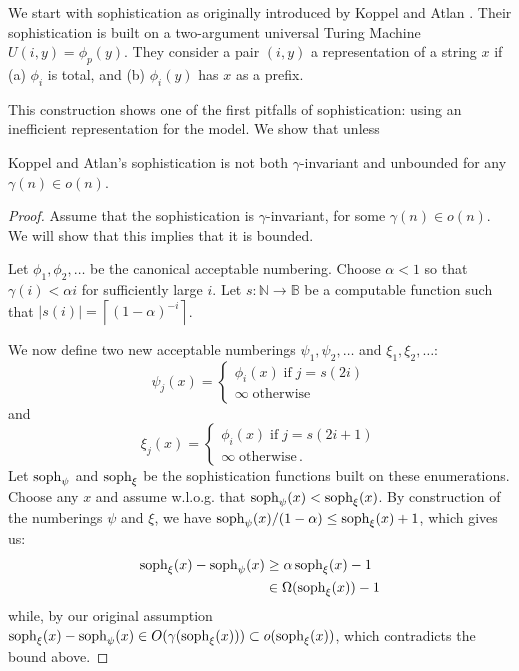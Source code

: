 \documentclass{style/llncs}
\newcommand{\B}{\mathbb B}
\newcommand{\N}{\mathbb N}
\newcommand{\tn}[1]{\textnormal{#1}}
\newcommand{\s}{\tn{soph}}
\newcommand{\num}[1]{#1_1, #1_2, \ldots}
\newcommand{\p}{\,\text{.}}
\begin{document}
We start with sophistication as originally introduced by Koppel and Atlan \cite{koppelSoph1988,koppel1991almost}. Their sophistication is built on a two-argument universal Turing Machine $U(i, y) = \phi_p(y)$. They consider a pair $(i, y)$ a representation of a string $x$ if (a) $\phi_i$ is total, and (b) $\phi_i(y)$ has $x$ as a prefix.\footnotemark 


This construction shows one of the first pitfalls of sophistication: using an inefficient representation for the model. We show that unless 
\begin{lemma}
Koppel and Atlan's sophistication is not both $\gamma$-invariant and unbounded for any $\gamma(n) \in o(n)$.
\end{lemma}
\begin{proof}
Assume that the sophistication is $\gamma$-invariant, for some $\gamma(n) \in o(n)$. We will show that this implies that it is bounded.

Let $\num{\phi}$ be the canonical acceptable numbering. Choose $\alpha < 1$ so that $\gamma(i) < \alpha i$ for sufficiently large $i$. Let $s: \N \to \B$ be a computable function such that $|s(i)| = \left\lceil(1-\alpha)^{-i}\right\rceil$.

We now define two new acceptable numberings $\num{\psi}$ and $\num{\xi}$:
\[
\psi_j(x) = 
\begin{cases}
	\phi_i(x) \;\text{if}\; j = s(2i) \\
	\infty\;\text{otherwise}
\end{cases}
\]
and 
\[
\xi_j(x) = 
\begin{cases}
	\phi_i(x) \;\text{if}\; j = s(2i+1) \\
	\infty \;\text{otherwise}\p
\end{cases}
\]
Let $\s_\psi$ and $\s_\xi$ be the sophistication functions built on these enumerations. Choose any $x$ and assume w.l.o.g. that $\s_\psi(x) < \s_\xi(x)$. By construction of the numberings $\psi$ and $\xi$, we have $\s_\psi(x)/ (1-\alpha)  \leq \s_\xi(x) + 1$, which gives us:
\begin{align*}
	\s_\xi(x) - \s_\psi(x) &\geq \alpha\, \s_\xi(x) - 1\\
	& \in \Omega(\s_\xi(x)) - 1\\
\end{align*}
while, by our original assumption $\s_\xi(x) - \s_\psi(x) \in O(\gamma(\s_\xi(x))) \subset o(\s_\xi(x))$, which contradicts the bound above.
\end{proof}
\end{document}
